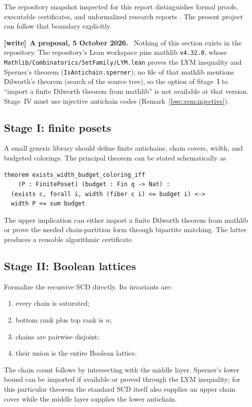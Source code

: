 \documentclass[11pt,letterpaper]{article}
\numberwithin{equation}{section}
\theoremstyle{plain}
\theoremstyle{definition}
\theoremstyle{remark}
\newcommand{\file}[1]{\nolinkurl{#1}}
\newenvironment{writenote}[1][]{\par\smallskip\begingroup\small
 \noindent\textbf{[write]}\if\relax\detokenize{#1}\relax\else~\textbf{#1.}\fi\ }%
 {\par\endgroup\smallskip}
\begin{document}
The repository snapshot inspected for this report distinguishes formal proofs,
executable certificates, and unformalized research reports \cite{ProveIt}.
The present project can follow that boundary explicitly.

\begin{writenote}[A proposal, 5 October 2026]
Nothing of this section exists in the repository. The repository's Lean
workspace pins mathlib \texttt{v4.32.0}, whose
\file{Mathlib/Combinatorics/SetFamily/LYM.lean} proves the LYM inequality and
Sperner's theorem (\texttt{IsAntichain.sperner}); no file of that mathlib
mentions Dilworth's theorem (search of the source tree), so the option of
Stage~I to ``import a finite Dilworth theorem from mathlib'' is not available
at that version. Stage~IV must use injective antichain codes
(Remark~\ref{bwc:rem:injective}).
\end{writenote}

\subsection{Stage I: finite posets}
A small generic library should define finite antichains, chain covers, width,
and budgeted colorings.  The principal theorem can be stated schematically as
\begin{verbatim}
theorem exists_width_budget_coloring_iff
    (P : FinitePoset) (budget : Fin q -> Nat) :
  (exists c, forall i, width (fiber c i) <= budget i) <->
  width P <= sum budget
\end{verbatim}
The upper implication can either import a finite Dilworth theorem from
mathlib or prove the needed chain-partition form through bipartite matching.
The latter produces a reusable algorithmic certificate.

\subsection{Stage II: Boolean lattices}
Formalize the recursive SCD directly.  Its invariants are:
\begin{enumerate}
\item every chain is saturated;
\item bottom rank plus top rank is $n$;
\item chains are pairwise disjoint;
\item their union is the entire Boolean lattice.
\end{enumerate}
The chain count follows by intersecting with the middle layer.  Sperner's
lower bound can be imported if available or proved through the LYM inequality;
for this particular theorem the standard SCD itself also supplies an upper
chain cover while the middle layer supplies the lower antichain.
\end{document}

